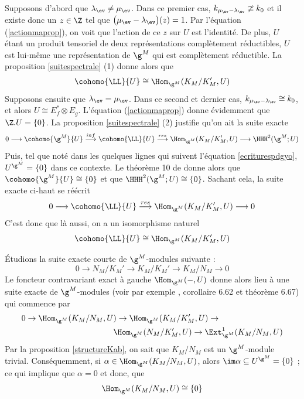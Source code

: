 \begin{Prop}
\begin{pre}
Supposons d'abord que $\lambda_{\ev} \neq \mu_{\ev}$. Dans ce premier cas, $k_{\mu_{\ev} - \lambda_{\ev}} \ncong k_0$ et il existe donc un $z \in \Z$ tel que $\big(\mu_{\ev}-\lambda_{\ev}\big)(z) = 1$. Par l'équation (\ref{actionmaprop}), on voit que l'action de ce $z$ sur $U$ est l'identité. De plus, $U$ étant un produit tensoriel de deux représentations complètement réductibles, $U$ est lui-même une représentation de $\g^M$ qui est complètement réductible. La proposition \ref{suitespectrale} (1) donne alors que 
$$ \cohomo{\LL}{U} \cong \Hom_{\g^M}(K_M/K_M',U) $$
Supposons ensuite que $\lambda_{\ev} = \mu_{\ev}$. Dans ce second et dernier cas, $k_{\mu_{\ev} - \lambda_{\ev}} \cong k_0$, et alors $U \cong E_f^* \otimes E_g$.  L'équation (\ref{actionmaprop}) donne évidemment que $\Z.U = \{0\}$. La proposition \ref{suitespectrale} (2) justifie qu'on ait la suite exacte
$$ 0 \longrightarrow \cohomo{\g^M}{U} \stackrel{inf}{\longrightarrow} \cohomo{\LL}{U} \stackrel{res}{\longrightarrow} \Hom_{\g^M}(K_M/K_M',U) \longrightarrow \HHH^2(\g^M;U) $$
Puis, tel que noté dans les quelques lignes qui suivent l'équation \ref{ecriturespdgyo}, $U^{\g^M} = \{0\}$ dans ce contexte. Le théorème 10 de \cite{HSlie} donne alors que $\cohomo{\g^M}{U} \cong \{0\}$ et que $\HHH^2(\g^M;U) \cong \{0\}$. Sachant cela, la suite exacte ci-haut se réécrit
$$ 0 \longrightarrow \cohomo{\LL}{U} \stackrel{res}{\longrightarrow} \Hom_{\g^M}(K_M/K_M',U) \longrightarrow 0 $$
C'est donc que là aussi, on a un isomorphisme naturel 
$$ \cohomo{\LL}{U} \cong \Hom_{\g^M}(K_M/K_M',U) $$

Étudions la suite exacte courte de $\g^M$-modules suivante : 
$$ 0 \rightarrow N_M/K_M' \rightarrow K_M/K_M' \rightarrow K_M/N_M \rightarrow 0 $$
Le foncteur contravariant exact à gauche $\Hom_{\g^M}(-,U)$ donne alors lieu à une suite exacte de $\g^M$-modules (voir par exemple \cite{Rotman}, corollaire 6.62 et théorème 6.67) qui commence par
\begin{align*}
0 \rightarrow \Hom_{\g^M}(K_M/N_M,U&) \rightarrow \Hom_{\g^M}(K_M/K_M',U) \rightarrow \\
&\Hom_{\g^M}(N_M/K_M',U) \rightarrow \Ext_{\g^M}^1(K_M/N_M,U) 
\end{align*}
Par la proposition \ref{structureKab}, on sait que $K_M/N_M$ est un $\g^M$-module trivial. Conséquemment, si $\alpha \in \Hom_{\g^M}(K_M/N_M,U)$, alors $\im \alpha \subseteq U^{\g^M} = \{0\}$ ; ce qui implique que $\alpha = 0$ et donc, que 
\begin{equation} \label{premierpas}
\Hom_{\g^M}(K_M/N_M,U) \cong \{0\}
\end{equation}


\end{pre}
\end{Prop}
